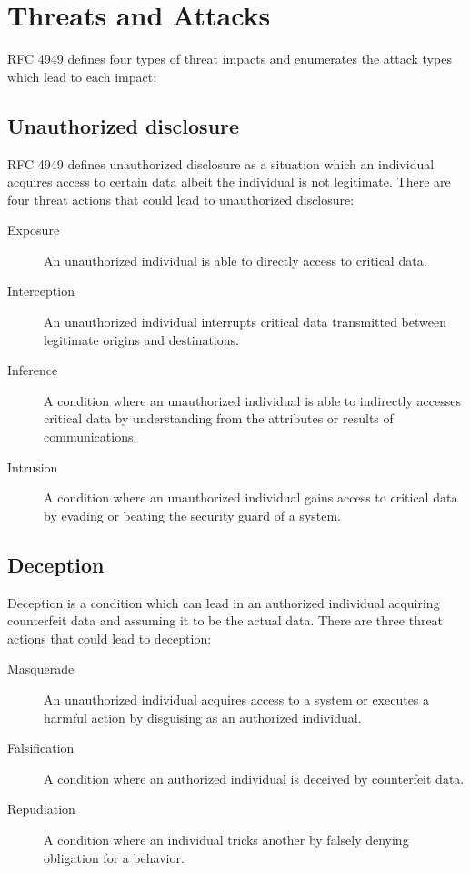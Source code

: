 \documentclass[../index.tex]{subfiles}
\begin{document}
\section{Threats and Attacks}

RFC 4949 defines four types of threat impacts and enumerates the attack types which lead to each
impact:

\subsection{Unauthorized disclosure}

RFC 4949 defines unauthorized disclosure as a situation which an individual acquires access to
certain data albeit the individual is not legitimate. There are four threat actions that could lead
to unauthorized disclosure:

\begin{description}

  \item[Exposure] An unauthorized individual is able to directly access to critical data.

  \item[Interception] An unauthorized individual interrupts critical data transmitted between
    legitimate origins and destinations.

  \item[Inference] A condition where an unauthorized individual is able to indirectly accesses
    critical data by understanding from the attributes or results of communications.

  \item[Intrusion] A condition where an unauthorized individual gains access to critical data by
    evading or beating the security guard of a system.

\end{description}

\subsection{Deception}

Deception is a condition which can lead in an authorized individual acquiring counterfeit data and
assuming it to be the actual data. There are three threat actions that could lead to deception:

\begin{description}

  \item[Masquerade] An unauthorized individual acquires access to a system or executes a harmful
    action by disguising as an authorized individual.

  \item[Falsification] A condition where an authorized individual is deceived by counterfeit data.

  \item[Repudiation] A condition where an individual tricks another by falsely denying obligation
    for a behavior.

\end{description}
\end{document}
